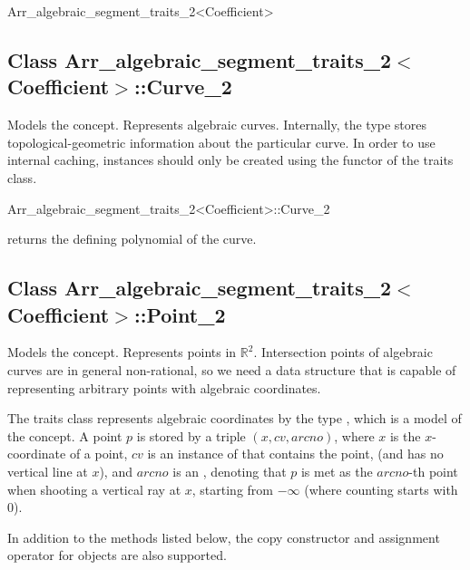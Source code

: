 \begin{ccRefClass}{Arr_algebraic_segment_traits_2<Coefficient>}

\subsection*{Class
         Arr\_algebraic\_segment\_traits\_2$<$Coefficient$>$::Curve\_2}

Models the  concept. 
Represents algebraic curves. Internally, the type stores
topological-geometric information about the particular curve.
In order to use internal caching, instances should only be created
using the  functor of the traits class.

\begin{ccClass}{Arr_algebraic_segment_traits_2<Coefficient>::Curve_2}


  {returns the defining polynomial of the curve.}

\end{ccClass}


\subsection*{Class
         Arr\_algebraic\_segment\_traits\_2$<$Coefficient$>$::Point\_2}

Models the  concept.
Represents points in $\mathbb{R}^2$. Intersection points of algebraic curves
are in general non-rational, so we need a data structure that is capable
of representing arbitrary points with algebraic coordinates.

The traits class represents algebraic coordinates by the type
, which is a model of the 
concept.
A point $p$ is stored by a triple $(x,cv,arcno)$, 
where $x$ is the $x$-coordinate of a point, $cv$ is an instance 
of  that contains the point, (and has no vertical line at $x$),
and $arcno$ is an , denoting that $p$ is met as the $arcno$-th
point when shooting a vertical ray at $x$, starting from $-\infty$
(where counting starts with $0$). 

In addition to the methods listed below, the copy constructor and assignment
operator for  objects are also supported.


\end{ccRefClass}
